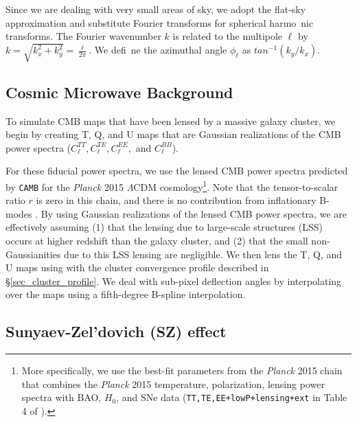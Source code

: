 Since we are dealing with very small areas of sky, we adopt the flat-sky approximation and substitute Fourier transforms for spherical harmo\
nic transforms. The Fourier wavenumber $k$ is related to the multipole $\ell$ by $k = \sqrt{k_x^{2} + k_y^{2}} = \frac{\ell}{2\pi}$. We defi\
ne the azimuthal angle $\phi_{\ell}$ as $tan^{-1}(k_{y} / k_x)$.\subsection{Cosmic Microwave Background}
\label{sec_appendix_CMB}

To simulate CMB maps that have been lensed by a massive galaxy cluster, we begin by creating T, Q, and U maps that are Gaussian realizations \citep{kamionkowski1996} of the CMB power spectra ($C_{\ell}^{TT}, C_{\ell}^{TE}, C_{\ell}^{EE},$ and $C_{\ell}^{BB}$). 
\iffalse{Note that the Q and U spectra are set by $C_{\ell}^{EE}$ and $C_{\ell}^{BB}$ according to:
\begin{eqnarray}
Q_{\ell} &=& E_{\ell}\ cos (2 \phi_{\ell}) - B_{\ell}\ sin (2 \phi_{\ell})\\
U_{\ell} &=& E_{\ell}\ sin (2 \phi_{\ell}) + B_{\ell}\ cos (2 \phi_{\ell})
\label{eq_QU_from_EB}
\end{eqnarray}}\fi
For these fiducial power spectra, we use the lensed CMB power spectra predicted by \texttt{CAMB} \citep{lewis2000} for the \emph{Planck} 2015 $\Lambda$CDM cosmology\footnote{More specifically, we use the best-fit parameters from the \emph{Planck} 2015 chain that combines the \emph{Planck} 2015 temperature, polarization, lensing power spectra with BAO, $H_{0}$, and SNe data (\texttt{TT,TE,EE+lowP+lensing+ext} in Table 4 of \cite{planckcosmo2015}).}. Note that the tensor-to-scalar ratio $r$ is zero in this chain, and there is no contribution from inflationary B-modes \citep{baumann2009}. By using Gaussian realizations of the lensed CMB power spectra, we are effectively assuming (1) that the lensing due to large-scale structures (LSS) occurs at higher redshift than the galaxy cluster, and (2) that the small non-Gaussianities due to this LSS lensing are negligible. We then lens the T, Q, and U maps using with the cluster convergence profile described in \S\ref{sec_cluster_profile}. 
We deal with sub-pixel deflection angles by interpolating over the maps using a fifth-degree B-spline interpolation. 

\subsection{Sunyaev-Zel'dovich (SZ) effect}
\label{sec_appendix_SZ}

